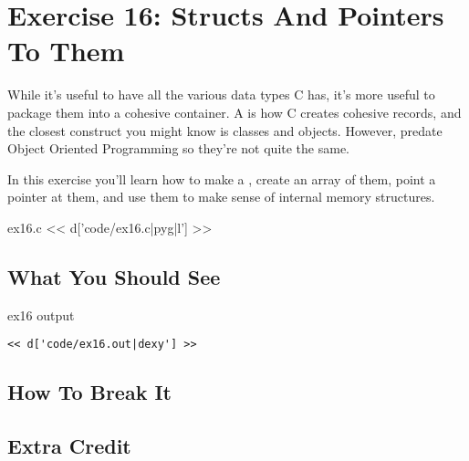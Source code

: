 \chapter{Exercise 16: Structs And Pointers To Them}

While it's useful to have all the various data types C has,
it's more useful to package them into a cohesive container.
A  is how C creates cohesive records, and the
closest construct you might know is classes and objects.  However,
 predate Object Oriented Programming so they're
not quite the same.

In this exercise you'll learn how to make a ,
create an array of them, point a pointer at them, and use them
to make sense of internal memory structures.

\begin{code}{ex16.c}
<< d['code/ex16.c|pyg|l'] >>
\end{code}

\section{What You Should See}

\begin{code}{ex16 output}
\begin{lstlisting}
<< d['code/ex16.out|dexy'] >>
\end{lstlisting}
\end{code}

\section{How To Break It}


\section{Extra Credit}




